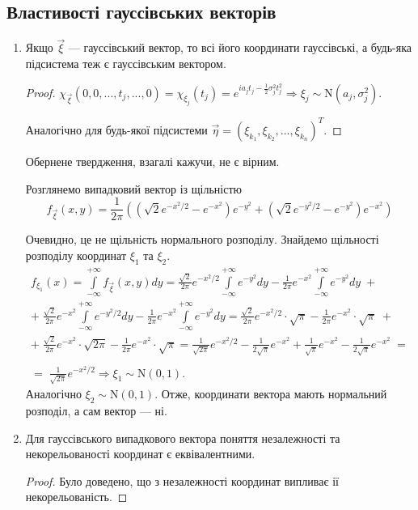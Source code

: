 \subsection{Властивості гауссівських векторів}
\begin{enumerate}
    \item Якщо $\vec{\xi}$ --- гауссівський вектор, то всі його координати гауссівські,
    а будь-яка підсистема теж є гауссівським вектором.
    \begin{proof}
        $\chi_{\vec{\xi}}(0,0,...,t_j, ..., 0) = \chi_{\xi_j}(t_j) = 
        e^{i a_j t_j - \frac{1}{2}\sigma_j^2 t_j^2} \Rightarrow \xi_j \sim \mathrm{N}(a_j, \sigma_j^2)$.

        Аналогічно для будь-якої підсистеми $\vec{\eta} = (\xi_{k_1}, \xi_{k_2}, ..., \xi_{k_n})^T$.
    \end{proof}
    \begin{remark}
        Обернене твердження, взагалі кажучи, не є вірним.

        Розглянемо випадковий вектор із щільністю
        $$ f_{\vec{\xi}}(x, y) = \frac{1}{2\pi} \left( 
            \left( \sqrt{2} e^{-x^2/2} - e^{-x^2}\right)e^{-y^2} + 
            \left( \sqrt{2} e^{-y^2/2} - e^{-y^2}\right)e^{-x^2}\right)$$

        Очевидно, це не щільність нормального розподілу. Знайдемо щільності розподілу координат $\xi_1$ та $\xi_2$.
        \begin{gather*}
            f_{\xi_1}(x) = \int\limits_{-\infty}^{+\infty}f_{\vec{\xi}}(x, y) dy =
            \frac{\sqrt{2}}{2\pi} e^{-x^2/2}\int\limits_{-\infty}^{+\infty}e^{-y^2}dy -
            \frac{1}{2\pi}e^{-x^2}\int\limits_{-\infty}^{+\infty}e^{-y^2}dy \; +\\
            + \; \frac{\sqrt{2}}{2\pi}e^{-x^2}\int\limits_{-\infty}^{+\infty} e^{-y^2/2}dy - 
            \frac{1}{2\pi} e^{-x^2}\int\limits_{-\infty}^{+\infty}e^{-y^2}dy =
            \frac{\sqrt{2}}{2\pi} e^{-x^2/2}\cdot \sqrt{\pi} - \frac{1}{2\pi}e^{-x^2} \cdot \sqrt{\pi} \; + \\
            + \; \frac{\sqrt{2}}{2\pi}e^{-x^2} \cdot \sqrt{2\pi} - \frac{1}{2\pi}e^{-x^2}\cdot \sqrt{\pi} = 
            \frac{1}{\sqrt{2\pi}}e^{-x^2/2} - \frac{1}{2\sqrt{\pi}}e^{-x^2} + \frac{1}{\sqrt{\pi}}e^{-x^2} - \frac{1}{2\sqrt{\pi}}e^{-x^2} \; = \\ 
            \\ = \; \frac{1}{\sqrt{2\pi}}e^{-x^2/2} \Rightarrow \xi_1 \sim \mathrm{N}(0, 1).
        \end{gather*}
        Аналогічно $\xi_2 \sim \mathrm{N}(0, 1)$. Отже, координати вектора мають нормальний розподіл, а сам вектор --- ні.
    \end{remark}
    \item Для гауссівського випадкового вектора поняття незалежності та некорельованості координат є еквівалентними.
    \begin{proof}
        Було доведено, що з незалежності координат випливає ії некорельованість.


\end{proof}
\end{enumerate}
